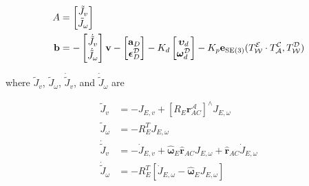 \begin{equation}
    \begin{aligned}
        A & =
        \begin{bmatrix}
            \tilde{J}_v \\
            \tilde{J}_{\omega}
        \end{bmatrix} \\
        \mathbf{b} & = 
        -\begin{bmatrix}
            \dot{\tilde{J}}_v \\
            \dot{\tilde{J}}_{\omega}
        \end{bmatrix}
        \mathbf{v}
        - \begin{bmatrix}
          \mathbf{a}_D \\
          \boldsymbol{\epsilon}_D^{\mathcal{D}}  
        \end{bmatrix}
        - K_d
        \begin{bmatrix}
            \boldsymbol{\upsilon}_d \\
            \boldsymbol{\omega}_d^{\mathcal{D}}
        \end{bmatrix}
        - K_p
        \mathbf{e}_{\text{SE}(3)}(
            T_{\mathcal{W}}^{\mathcal{E}} \cdot
            T_{\mathcal{A}}^{\mathcal{C}}, 
            T_{\mathcal{W}}^{\mathcal{D}}
        )
    \end{aligned}
    \label{eqn:b_control_rigid_b}
\end{equation}

where $\tilde{J}_v$, $\tilde{J}_{\omega}$, $\dot{\tilde{J}}_v$, and 
$\dot{\tilde{J}}_{\omega}$ are

\begin{equation}
    \begin{aligned}
        \tilde{J}_v & = -J_{E,v} + [R_E \mathbf{r}_{AC}^{\mathcal{A}}]^{\wedge}
        J_{E, \omega} \\
        \tilde{J}_{\omega} & = - R_E^T J_{E, \omega} \\
        \dot{\tilde{J}}_v & = -\dot{J}_{E, v} + 
        \hat{\boldsymbol{\omega}}_E \hat{\mathbf{r}}_{AC} J_{E, \omega} + 
        \hat{\mathbf{r}}_{AC} \dot{J}_{E, \omega} \\
        \dot{\tilde{J}}_{\omega} & = - R_E^T [
            \dot{J}_{E, \omega} - \hat{\boldsymbol{\omega}}_E J_{E, \omega}
        ]
    \end{aligned}
    \label{eqn:jacobians_for_rigid_control}
\end{equation}
